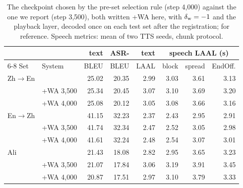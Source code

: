 \begin{table}[t]
\centering\scriptsize
\setlength{\tabcolsep}{2pt}
\begin{tabular}{llrrrrrr}
\toprule
 & & text & ASR- & text & \multicolumn{3}{c}{speech LAAL (s)} \\
\cmidrule(lr){6-8}
Set & System & BLEU & BLEU & LAAL & block & spread & EndOff. \\
\midrule
Zh$\rightarrow$En & \sys{} & 25.02 & 20.35 & 2.99 & 3.03 & 3.61 & 3.13 \\
 & +WA 3{,}500 & 25.34 & 20.45 & 3.07 & 3.10 & 3.69 & 3.20 \\
 & +WA 4{,}000 & 25.08 & 20.12 & 3.05 & 3.08 & 3.66 & 3.16 \\
\midrule
En$\rightarrow$Zh & \sys{} & 41.15 & 32.23 & 2.37 & 2.43 & 2.95 & 2.91 \\
 & +WA 3{,}500 & 41.74 & 32.34 & 2.47 & 2.52 & 3.05 & 2.98 \\
 & +WA 4{,}000 & 41.61 & 32.24 & 2.48 & 2.54 & 3.07 & 3.01 \\
\midrule
Ali & \sys{} & 21.43 & 18.08 & 2.82 & 2.95 & 3.65 & 3.23 \\
 & +WA 3{,}500 & 21.07 & 17.84 & 3.06 & 3.19 & 3.91 & 3.45 \\
 & +WA 4{,}000 & 20.87 & 17.51 & 2.97 & 3.10 & 3.79 & 3.33 \\
\bottomrule
\end{tabular}
\caption{The checkpoint chosen by the pre-set selection rule (step 4{,}000) against the one we report (step 3{,}500), both written +WA here, with $\delta_{\mathrm{w}}=-1$ and the playback layer, decoded once on each test set after the registration; \sys{} for reference. Speech metrics: mean of two TTS seeds, chunk protocol.}
\label{tab:s4000}
\end{table}
